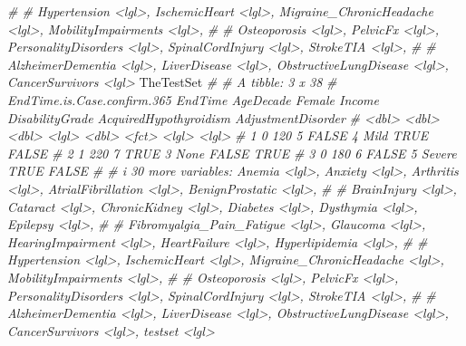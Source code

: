 \documentclass[
]{article}
\newenvironment{Shaded}{\begin{snugshade}}{\end{snugshade}}
\newcommand{\CommentTok}[1]{\textcolor[rgb]{0.56,0.35,0.01}{\textit{#1}}}
\newcommand{\NormalTok}[1]{#1}
\begin{document}
\begin{Shaded}
\begin{Highlighting}[]
\CommentTok{\# \#   Hypertension \textless{}lgl\textgreater{}, IschemicHeart \textless{}lgl\textgreater{}, Migraine\_ChronicHeadache \textless{}lgl\textgreater{}, MobilityImpairments \textless{}lgl\textgreater{},}
\CommentTok{\# \#   Osteoporosis \textless{}lgl\textgreater{}, PelvicFx \textless{}lgl\textgreater{}, PersonalityDisorders \textless{}lgl\textgreater{}, SpinalCordInjury \textless{}lgl\textgreater{}, StrokeTIA \textless{}lgl\textgreater{},}
\CommentTok{\# \#   AlzheimerDementia \textless{}lgl\textgreater{}, LiverDisease \textless{}lgl\textgreater{}, ObstructiveLungDisease \textless{}lgl\textgreater{}, CancerSurvivors \textless{}lgl\textgreater{}}
\NormalTok{TheTestSet}
\CommentTok{\# \# A tibble: 3 x 38}
\CommentTok{\#   EndTime.is.Case.confirm.365 EndTime AgeDecade Female Income DisabilityGrade AcquiredHypothyroidism AdjustmentDisorder}
\CommentTok{\#                         \textless{}dbl\textgreater{}   \textless{}dbl\textgreater{}     \textless{}dbl\textgreater{} \textless{}lgl\textgreater{}   \textless{}dbl\textgreater{} \textless{}fct\textgreater{}           \textless{}lgl\textgreater{}                  \textless{}lgl\textgreater{}             }
\CommentTok{\# 1                           0     120         5 FALSE       4 Mild            TRUE                   FALSE             }
\CommentTok{\# 2                           1     220         7 TRUE        3 None            FALSE                  TRUE              }
\CommentTok{\# 3                           0     180         6 FALSE       5 Severe          TRUE                   FALSE             }
\CommentTok{\# \# i 30 more variables: Anemia \textless{}lgl\textgreater{}, Anxiety \textless{}lgl\textgreater{}, Arthritis \textless{}lgl\textgreater{}, AtrialFibrillation \textless{}lgl\textgreater{}, BenignProstatic \textless{}lgl\textgreater{},}
\CommentTok{\# \#   BrainInjury \textless{}lgl\textgreater{}, Cataract \textless{}lgl\textgreater{}, ChronicKidney \textless{}lgl\textgreater{}, Diabetes \textless{}lgl\textgreater{}, Dysthymia \textless{}lgl\textgreater{}, Epilepsy \textless{}lgl\textgreater{},}
\CommentTok{\# \#   Fibromyalgia\_Pain\_Fatigue \textless{}lgl\textgreater{}, Glaucoma \textless{}lgl\textgreater{}, HearingImpairment \textless{}lgl\textgreater{}, HeartFailure \textless{}lgl\textgreater{}, Hyperlipidemia \textless{}lgl\textgreater{},}
\CommentTok{\# \#   Hypertension \textless{}lgl\textgreater{}, IschemicHeart \textless{}lgl\textgreater{}, Migraine\_ChronicHeadache \textless{}lgl\textgreater{}, MobilityImpairments \textless{}lgl\textgreater{},}
\CommentTok{\# \#   Osteoporosis \textless{}lgl\textgreater{}, PelvicFx \textless{}lgl\textgreater{}, PersonalityDisorders \textless{}lgl\textgreater{}, SpinalCordInjury \textless{}lgl\textgreater{}, StrokeTIA \textless{}lgl\textgreater{},}
\CommentTok{\# \#   AlzheimerDementia \textless{}lgl\textgreater{}, LiverDisease \textless{}lgl\textgreater{}, ObstructiveLungDisease \textless{}lgl\textgreater{}, CancerSurvivors \textless{}lgl\textgreater{}, testset \textless{}lgl\textgreater{}}
\end{Highlighting}
\end{Shaded}
\end{document}
